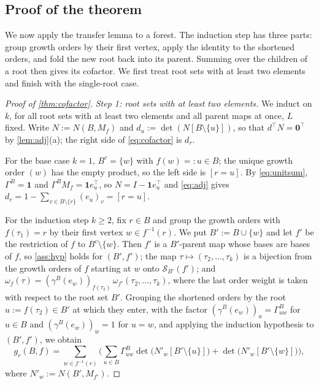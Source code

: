 \documentclass[onefignum,onetabnum]{siamart250211}
\numberwithin{theorem}{section}
\numberwithin{equation}{section}
\newcommand{\Orders}{\mathcal{S}}
\newcommand{\one}{\mathbf{1}}
\newcommand{\zero}{\mathbf{0}}
\begin{document}
\subsection{Proof of the theorem}

We now apply the transfer lemma to a forest. The induction step has
three parts: group growth orders by their first vertex, apply the
identity to the shortened orders, and fold the new root back into its
parent. Summing over the children of a root then gives its cofactor.
We first treat root sets with at least two elements and finish with
the single-root case.

\begin{proof}[Proof of \cref{thm:cofactor}]
\emph{Step 1: root sets with at least two elements.} We induct on $k$, for all root sets with at
least two elements and all parent maps at once, $L$ fixed. Write
$N:=N(B,M_f)$ and $d_u:=\det(N[B\setminus\{u\}])$, so that
$d^{\top}N=\zero^{\top}$ by \cref{lem:adj}(a); the right side of
\eqref{eq:cofactor} is $d_r$.

For the base case $k=1$, $B^c=\{w\}$ with $f(w)=:u\in B$; the unique growth order
$(w)$ has the empty product, so the left side is $[r=u]$. By
\eqref{eq:unitsum}, $\Gamma^B=\one$ and $\Gamma^BM_f=\one e_{u}^{\top}$, so
$N=I-\one e_{u}^{\top}$ and \eqref{eq:adj} gives
$d_r=1-\sum_{v\in B\setminus\{r\}}(e_{u})_v=[r=u]$.

For the induction step $k\ge2$, fix $r\in B$ and group the growth orders with
$f(\tau_1)=r$ by their first vertex $w\in f^{-1}(r)$. We put
$B':=B\cup\{w\}$ and let $f'$ be the restriction of $f$ to
$B^c\setminus\{w\}$. Then $f'$ is a $B'$-parent map whose bases are
bases of $f$, so \cref{ass:hyp} holds for $(B',f')$; the map
$\tau\mapsto(\tau_2,\dots,\tau_k)$ is a bijection from the growth
orders of $f$ starting at $w$ onto $\Orders_{B'}(f')$; and
$\omega_f(\tau)=(\gamma^{B}(e_w))_{f(\tau_2)}\,\omega_{f'}(\tau_2,\dots,\tau_k)$,
where the last order weight is taken with respect to the root set $B'$.
Grouping the shortened orders by the root $u:=f(\tau_2)\in B'$ at which
they enter, with the factor $(\gamma^{B}(e_w))_u=\Gamma^B_{uw}$ for
$u\in B$ and $(\gamma^{B}(e_w))_w=1$ for $u=w$, and applying the
induction hypothesis to $(B',f')$, we obtain
\begin{equation}\label{eq:step1}
g_r(B,f)=\sum_{w\in f^{-1}(r)}\Big(\sum_{u\in B}
\Gamma^B_{uw}\det\big(N'_w[B'\setminus\{u\}]\big)
+\det\big(N'_w[B'\setminus\{w\}]\big)\Big),
\end{equation}
where $N'_w:=N(B',M_{f'})$.


\end{proof}
\end{document}

